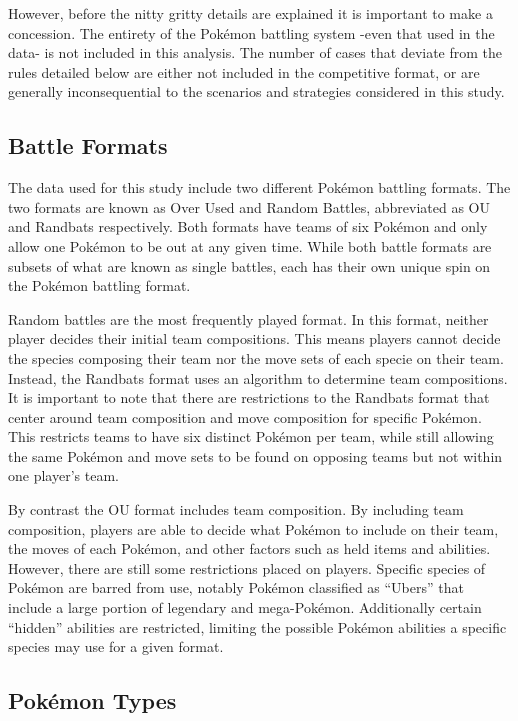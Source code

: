 \documentclass[12pt,twoside]{reedthesis}
\begin{document}
  However, before the nitty gritty details are explained it is important
  to make a concession. The entirety of the Pokémon battling system -even
  that used in the data- is not included in this analysis. The number of
  cases that deviate from the rules detailed below are either not included
  in the competitive format, or are generally inconsequential to the
  scenarios and strategies considered in this study.
  
  \subsection{Battle Formats}\label{battle-formats}
  
  The data used for this study include two different Pokémon battling
  formats. The two formats are known as Over Used and Random Battles,
  abbreviated as OU and Randbats respectively. Both formats have teams of
  six Pokémon and only allow one Pokémon to be out at any given time.
  While both battle formats are subsets of what are known as single
  battles, each has their own unique spin on the Pokémon battling format.
  
  Random battles are the most frequently played format. In this format,
  neither player decides their initial team compositions. This means
  players cannot decide the species composing their team nor the move sets
  of each specie on their team. Instead, the Randbats format uses an
  algorithm to determine team compositions. It is important to note that
  there are restrictions to the Randbats format that center around team
  composition and move composition for specific Pokémon. This restricts
  teams to have six distinct Pokémon per team, while still allowing the
  same Pokémon and move sets to be found on opposing teams but not within
  one player's team.
  
  By contrast the OU format includes team composition. By including team
  composition, players are able to decide what Pokémon to include on their
  team, the moves of each Pokémon, and other factors such as held items
  and abilities. However, there are still some restrictions placed on
  players. Specific species of Pokémon are barred from use, notably
  Pokémon classified as ``Ubers'' that include a large portion of
  legendary and mega-Pokémon. Additionally certain ``hidden'' abilities
  are restricted, limiting the possible Pokémon abilities a specific
  species may use for a given format.
  
  \subsection{Pokémon Types}\label{pokemon-types}
  
\end{document}
